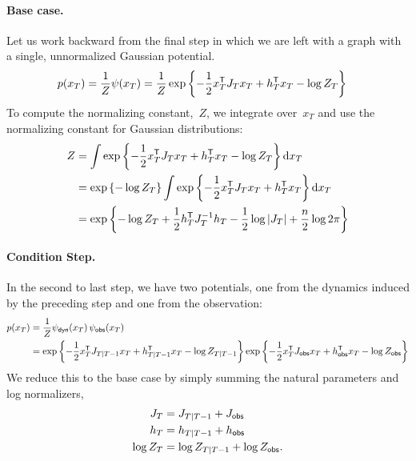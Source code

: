 \documentclass{article}
\begin{document}
\paragraph{Base case.} Let us work backward from the final step in which
we are left with a graph with a single, unnormalized Gaussian potential.
\begin{align}
  p(x_T) &= \frac{1}{Z} \psi(x_T)
  = \frac{1}{Z} \exp \left \{-\frac{1}{2} x_T^{\mathsf{T}} J_{T} x_T + h_{T}^{\mathsf{T}} x_T - \log Z_{T} \right \}
\end{align}
To compute the normalizing constant,~$Z$, we integrate over~$x_T$ and use
the normalizing constant for Gaussian distributions:
\begin{align}
  Z &= \int \exp \left \{-\frac{1}{2} x_T^{\mathsf{T}} J_{T} x_T + h_{T}^{\mathsf{T}} x_T - \log Z_{T} \right \} \mathrm{d} x_T \\
  &= \exp \left \{ -\log Z_{T} \right \}
  \int \exp \left \{-\frac{1}{2} x_T^{\mathsf{T}} J_{T} x_T + h_{T}^{\mathsf{T}} x_T \right \} \mathrm{d} x_T \\
  &= \exp \left \{ -\log Z_{T} +\frac{1}{2} h_{T}^{\mathsf{T}} J_{T}^{-1} h_{T} - \frac{1}{2} \log |J_{T}| +\frac{n}{2} \log 2 \pi \right \}
\end{align}

\paragraph{Condition Step.} In the second to last step, we have two potentials,
one from the dynamics induced by the preceding step and one from the observation:
\begin{align}
  p(x_T) &= \frac{1}{Z} \psi_{\sf dyn}(x_T) \, \psi_{\sf obs}(x_T) \\
  &= \exp \left \{-\frac{1}{2} x_T^{\mathsf{T}} J_{T|T-1} x_T + h_{T|T-1}^{\mathsf{T}} x_T - \log Z_{T|T-1} \right \}
  \exp \left \{-\frac{1}{2} x_T^{\mathsf{T}} J_{\sf obs} x_T + h_{\sf obs}^{\mathsf{T}} x_T - \log Z_{\sf obs} \right \}
\end{align}
We reduce this to the base case by simply summing the natural parameters and
log normalizers,
\begin{align}
  J_{T} &= J_{T|T-1} + J_{\sf obs} \\
  h_{T} &= h_{T|T-1} + h_{\sf obs} \\
  \log Z_{T} &= \log Z_{T|T-1} + \log Z_{\sf obs}.
\end{align}
\end{document}
